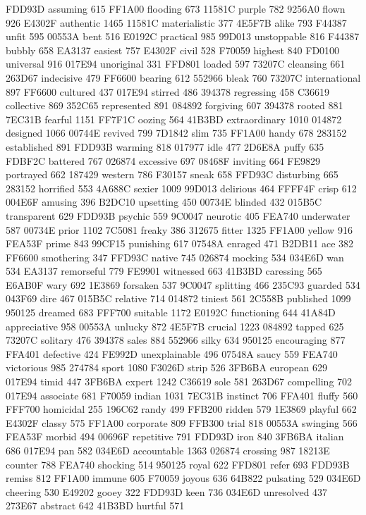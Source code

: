 FDD93D assuming 615 FF1A00 flooding 673 11581C purple 782 9256A0 flown
926 E4302F authentic 1465 11581C materialistic 377 4E5F7B alike 793
F44387 unfit 595 00553A bent 516 E0192C practical 985 99D013
unstoppable 816 F44387 bubbly 658 EA3137 easiest 757 E4302F civil 528
F70059 highest 840 FD0100 universal 916 017E94 unoriginal 331 FFD801
loaded 597 73207C cleansing 661 263D67 indecisive 479 FF6600 bearing
612 552966 bleak 760 73207C international 897 FF6600 cultured 437
017E94 stirred 486 394378 regressing 458 C36619 collective 869 352C65
represented 891 084892 forgiving 607 394378 rooted 881 7EC31B fearful
1151 FF7F1C oozing 564 41B3BD extraordinary 1010 014872 designed 1066
00744E revived 799 7D1842 slim 735 FF1A00 handy 678 283152 established
891 FDD93B warming 818 017977 idle 477 2D6E8A puffy 635 FDBF2C battered
767 026874 excessive 697 08468F inviting 664 FE9829 portrayed 662
187429 western 786 F30157 sneak 658 FFD93C disturbing 665 283152
horrified 553 4A688C sexier 1009 99D013 delirious 464 FFFF4F crisp 612
004E6F amusing 396 B2DC10 upsetting 450 00734E blinded 432 015B5C
transparent 629 FDD93B psychic 559 9C0047 neurotic 405 FEA740
underwater 587 00734E prior 1102 7C5081 freaky 386 312675 fitter 1325
FF1A00 yellow 916 FEA53F prime 843 99CF15 punishing 617 07548A enraged
471 B2DB11 ace 382 FF6600 smothering 347 FFD93C native 745 026874
mocking 534 034E6D wan 534 EA3137 remorseful 779 FE9901 witnessed 663
41B3BD caressing 565 E6AB0F wary 692 1E3869 forsaken 537 9C0047
splitting 466 235C93 guarded 534 043F69 dire 467 015B5C relative 714
014872 tiniest 561 2C558B published 1099 950125 dreamed 683 FFF700
suitable 1172 E0192C functioning 644 41A84D appreciative 958 00553A
unlucky 872 4E5F7B crucial 1223 084892 tapped 625 73207C solitary 476
394378 sales 884 552966 silky 634 950125 encouraging 877 FFA401
defective 424 FE992D unexplainable 496 07548A saucy 559 FEA740
victorious 985 274784 sport 1080 F3026D strip 526 3FB6BA european 629
017E94 timid 447 3FB6BA expert 1242 C36619 sole 581 263D67 compelling
702 017E94 associate 681 F70059 indian 1031 7EC31B instinct 706 FFA401
fluffy 560 FFF700 homicidal 255 196C62 randy 499 FFB200 ridden 579
1E3869 playful 662 E4302F classy 575 FF1A00 corporate 809 FFB300 trial
818 00553A swinging 566 FEA53F morbid 494 00696F repetitive 791 FDD93D
iron 840 3FB6BA italian 686 017E94 pan 582 034E6D accountable 1363
026874 crossing 987 18213E counter 788 FEA740 shocking 514 950125 royal
622 FFD801 refer 693 FDD93B remiss 812 FF1A00 immune 605 F70059 joyous
636 64B822 pulsating 529 034E6D cheering 530 E49202 gooey 322 FDD93D
keen 736 034E6D unresolved 437 273E67 abstract 642 41B3BD hurtful 571
